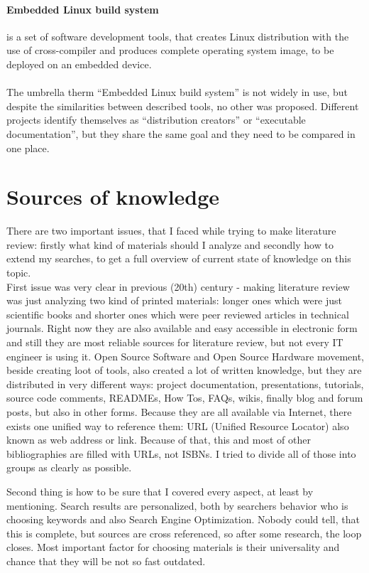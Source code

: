\documentclass[printmode]{mgr}
\begin{document}
\paragraph{Embedded Linux build system} is a set of software development tools, that creates Linux distribution with the use of cross-compiler and produces complete operating system image, to be deployed on an embedded device.
\\
\\
The umbrella therm ``Embedded Linux build system'' is not widely in use, but despite the similarities between described tools, no other was proposed. Different projects identify themselves as ``distribution creators'' or ``executable documentation'', but they share the same goal and they need to be compared in one place.

\section{Sources of knowledge}
\label{section:sources-of-knowledge}

There are two important issues, that I faced while trying to make literature review: firstly what kind of materials should I analyze and secondly how to extend my searches, to get a full overview of current state of knowledge on this topic.  \\

First issue was very clear in previous (20th) century - making literature review was just analyzing two kind of printed materials: longer ones which were just scientific books and shorter ones which were peer reviewed articles in technical journals.
Right now they are also available and easy accessible in electronic form and still they are most reliable sources for literature review, but not every IT engineer is using it.
Open Source Software and Open Source Hardware movement, beside creating loot of tools, also created a lot of written knowledge, but they are distributed in very different ways: project documentation, presentations, tutorials, source code comments, READMEs, How Tos, FAQs, wikis, finally blog and forum posts, but also in other forms.
Because they are all available via Internet, there exists one unified way to reference them: URL (Unified Resource Locator) also known as web address or link. Because of that, this and most of other bibliographies are filled with URLs, not ISBNs. I tried to divide all of those into groups as clearly as possible.

Second thing is how to be sure that I covered every aspect, at least by mentioning. Search results are personalized, both by searchers behavior who is choosing keywords and also Search Engine Optimization. Nobody could tell, that this is complete, but sources are cross referenced, so after some research, the loop closes. Most important factor for choosing materials is their universality and chance that they will be not so fast outdated.
\end{document}
